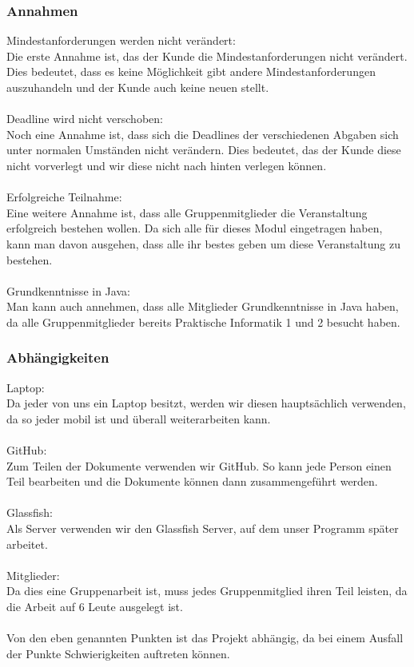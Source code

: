 \documentclass[fontsize=12pt,paper=a4,twoside]{scrartcl}
\begin{document}
\subsubsection{Annahmen}
Mindestanforderungen werden nicht verändert: \\
Die erste Annahme ist, das der Kunde die Mindestanforderungen nicht verändert. Dies bedeutet, dass es keine Möglichkeit gibt andere Mindestanforderungen auszuhandeln und der Kunde auch keine neuen stellt.\\
\bigskip \\
Deadline wird nicht verschoben: \\
Noch eine Annahme ist, dass sich die Deadlines der verschiedenen Abgaben sich unter normalen Umständen nicht verändern. Dies bedeutet, das der Kunde diese nicht vorverlegt und wir diese nicht nach hinten verlegen können. \\
\bigskip \\
Erfolgreiche Teilnahme: \\
Eine weitere Annahme ist, dass alle Gruppenmitglieder die Veranstaltung erfolgreich bestehen wollen. Da sich alle für dieses Modul eingetragen haben, kann man davon ausgehen, dass alle ihr bestes geben um diese Veranstaltung zu bestehen.\\
\bigskip \\
Grundkenntnisse in Java: \\
Man kann auch annehmen, dass alle Mitglieder Grundkenntnisse in Java haben, da alle Gruppenmitglieder bereits Praktische Informatik 1 und 2 besucht haben.\\

\subsubsection{Abhängigkeiten}

Laptop: \\
Da jeder von uns ein Laptop besitzt, werden wir diesen hauptsächlich verwenden, da so jeder mobil ist und überall weiterarbeiten kann.\\
\bigskip \\
GitHub: \\
Zum Teilen der Dokumente verwenden wir GitHub. So kann jede Person einen Teil bearbeiten und die Dokumente können dann zusammengeführt werden. \\
\bigskip \\
Glassfish: \\
Als Server verwenden wir den Glassfish Server, auf dem unser Programm später arbeitet. \\
\bigskip \\
Mitglieder: \\
Da dies eine Gruppenarbeit ist, muss jedes Gruppenmitglied ihren Teil leisten, da die Arbeit auf 6 Leute ausgelegt ist. \\
\bigskip \\
Von den eben genannten Punkten ist das Projekt abhängig, da bei einem Ausfall der Punkte Schwierigkeiten auftreten können.
\end{document}
